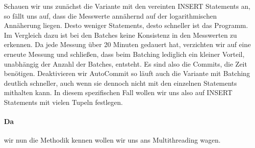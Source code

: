 Schauen wir uns zunächst die Variante mit den vereinten INSERT Statements an, so fällt uns auf, dass die Messwerte annähernd auf der logarithmischen Annäherung liegen.
Desto weniger Statements, desto schneller ist das Programm.
Im Vergleich dazu ist bei den Batches keine Konsistenz in den Messwerten zu erkennen.
Da jede Messung über 20 Minuten gedauert hat, verzichten wir auf eine erneute Messung und schließen, dass beim Batching lediglich ein kleiner Vorteil, unabhängig der Anzahl der Batches, entsteht.
Es sind also die Commits, die Zeit benötigen.
Deaktivieren wir AutoCommit so läuft auch die Variante mit Batching deutlich schneller, auch wenn sie dennoch nicht mit den einzelnen Statements mithalten kann.
In diesem spezifischen Fall wollen wir uns also auf INSERT Statements mit vielen Tupeln festlegen.


\paragraph{Da} wir nun die Methodik kennen wollen wir uns ans Multithreading wagen.
